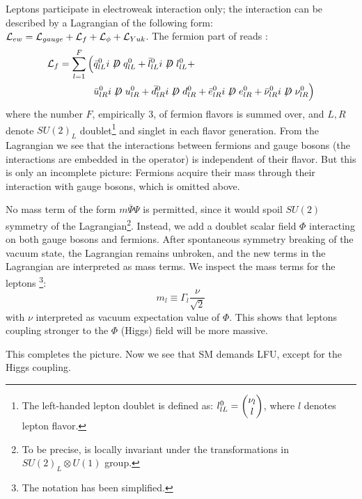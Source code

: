 Leptons participate in electroweak interaction only;
the interaction can be described by a Lagrangian of the following form:
$\mathcal{L}_{ew} = \mathcal{L}_{gauge} + \mathcal{L}_{f} + \mathcal{L}_{\phi} + \mathcal{L}_{Yuk}$.
The fermion part of  reads \cite{Langacker:2010zza}:
\begin{align*}
    \Lden{f} = \sum_{l = 1}^F \Big(
        & \bar{\spin{q}}^0_{lL} i \fsl{D} \spin{q}^0_{lL} +
          \bar{\spin{l}}^0_{lL} i \fsl{D} \spin{l}^0_{lL} + \\
        & \bar{u}^0_{lR} i \fsl{D} u^0_{lR} +
          \bar{d}^0_{lR} i \fsl{D} d^0_{lR} +
          \bar{e}^0_{lR} i \fsl{D} e^0_{lR} +
          \bar{\nu}^0_{lR} i \fsl{D} \nu^0_{lR}
    \Big)
\end{align*}
where the number $F$, empirically 3, of fermion flavors is summed over, and
$L,R$ denote $SU(2)_L$ doublet\footnote{
    The left-handed lepton doublet is defined as:
    $l^0_{lL} = \begin{pmatrix} \nu_l \\ l \end{pmatrix}$,
    where $l$ denotes lepton flavor.
}
and singlet in each flavor generation.
From the Lagrangian we see that the interactions between fermions and gauge
bosons (the interactions are embedded in the  operator) is independent
of their flavor.
But this is only an incomplete picture:
Fermions acquire their mass through their interaction with gauge bosons, which
is omitted above.

No mass term of the form $m \overline{\Psi} \Psi$ is permitted, since it would
spoil $SU(2)$ symmetry of the Lagrangian\footnote{
    To be precise,  is locally invariant under the transformations in
    $SU(2)_L \otimes U(1)$ group.
}.
Instead, we add a doublet scalar field $\Phi$ interacting on both gauge bosons
and fermions.
After spontaneous symmetry breaking of the vacuum state, the Lagrangian remains
unbroken, and the new terms in the Lagrangian are interpreted as mass terms.
We inspect the mass terms for the leptons \cite{Langacker:2010zza}\footnote{
    The notation has been simplified.
}:
\begin{equation*}
    m_l \equiv \Gamma_l \frac{\nu}{\sqrt{2}}
\end{equation*}
with $\nu$ interpreted as vacuum expectation value of $\Phi$.
This shows that leptons coupling stronger to the $\Phi$ (Higgs) field will be
more massive.

This completes the picture.
Now we see that SM demands LFU, except for the Higgs coupling.
